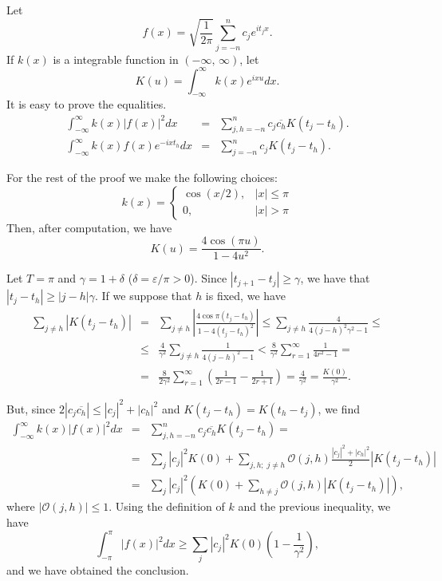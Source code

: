 \documentclass[12pt]{article}
\begin{document}
Let 
\[
f(x) = \sqrt{\frac{1}{2\pi}} \sum_{j = -n}^{n}  c_{j}e^{it_{j} x}.
\]
If $k(x)$ is a integrable function in $(-\infty, \, \infty)$, let
\[
K(u) = \int_{-\infty}^{\infty} k(x) e^{i x u} dx.
\]
It is easy to prove the equalities.
\begin{eqnarray*}
\int_{-\infty}^{\infty} k(x) |f(x)|^{2} dx & = & \sum_{j,h = -n}^{n} c_{j}\overline{c_{h}} K(t_{j} - t_{h}).\\
\int_{-\infty}^{\infty} k(x) f(x) e^{-i x t_{h}} dx & = & \sum_{j = -n}^{n}  c_{j} K (t_{j} - t_{h}).
\end{eqnarray*}

For the rest of the proof we make the following choices:
\[
k(x) = \left\{
\begin{array}{cl}
\cos(x/2), & |x| \leq \pi \\
0, & |x| > \pi
\end{array}
\right.
\]
Then, after computation, we have
\[
K(u) = \frac{4\cos(\pi u)}{1 - 4u^{2}}.
\]

Let $T = \pi$ and $\gamma = 1 + \delta$ ($\delta = \varepsilon/\pi > 0$).  Since $|t_{j+1} - t_{j}| \geq \gamma$, we have that $|t_{j} - t_{h}| \geq |j - h|\gamma$. If we suppose that $h$ is fixed, we have
\begin{eqnarray*}
\sum_{j \neq h} |K(t_{j} - t_{h})| & = & \sum_{j \neq h}\left| \frac{4\cos\pi(t_{j} - t_{h})}{1 - 4(t_{j} - t_{h})^{2}} \right| \leq \sum_{j \neq h} \frac{4}{4(j - h)^{2}\gamma^{2} - 1} \leq \\
& \leq & \frac{4}{\gamma^{2}}\sum_{j \neq h}\frac{1}{4(j - h)^{2} - 1} < \frac{8}{\gamma^{2}} \sum_{r = 1}^{\infty} \frac{1}{4r^{2} - 1} = \\
& = & \frac{8}{2\gamma^{2}} \sum_{r = 1}^{\infty} \left( \frac{1}{2r - 1} - \frac{1}{2r + 1} \right) = \frac{4}{ \gamma^{2}} = \frac{K(0)}{\gamma^{2}}.
\end{eqnarray*}

But, since $2|c_{j} \overline{c_{h}}| \leq |c_{j}|^{2} + |c_{h}|^{2}$ and $K(t_{j} - t_{h}) = K(t_{h} - t_{j})$, we find
\begin{eqnarray*}
\int_{-\infty}^{\infty} k(x) |f(x)|^{2} dx & = & \sum_{j,h = -n}^{n} c_{j}\overline{c_{h}} K(t_{j} - t_{h}) = \\
& = & \sum_{j} |c_{j}|^{2} K(0) + \sum_{j,h; \;j \neq h} \mathcal{O}(j,h) \frac{|c_{j}|^{2} + |c_{h}|^{2}}{2} |K(t_{j} - t_{h})|\\
& = & \sum_{j} |c_{j}|^{2} \left( K(0) + \sum_{h \neq j} \mathcal{O}(j,h) |K(t_{j} - t_{h})|\right), \; 
\end{eqnarray*}
where $|\mathcal{O}(j,h)| \leq 1$. Using the definition of $k$ and the previous inequality, we have
\begin{equation*}
\int_{-\pi}^{\pi} |f(x)|^{2} dx \geq \sum_{j} |c_{j}|^{2} K(0)(1 - \frac{1}{\gamma^{2}}),
\end{equation*}
and we have obtained the conclusion.
\end{document}
